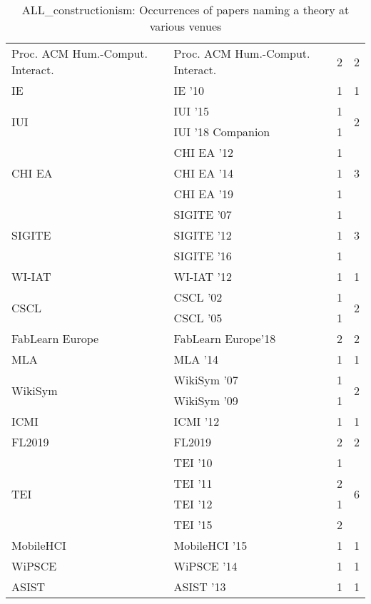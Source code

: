 \begin{table*}[t]
\begin{tabular}{llrr}
\multirow{1}{*}{Proc. ACM Hum.-Comput. Interact.} & Proc. ACM Hum.-Comput. Interact. & 2 & \multirow{1}{*}{2}\\
\multirow{1}{*}{IE } & IE '10 & 1 & \multirow{1}{*}{1}\\
\multirow{2}{*}{IUI } & IUI '15 & 1 & \multirow{2}{*}{2}\\
& IUI '18 Companion & 1 &\\
\multirow{3}{*}{CHI EA } & CHI EA '12 & 1 & \multirow{3}{*}{3}\\
& CHI EA '14 & 1 &\\
& CHI EA '19 & 1 &\\
\multirow{3}{*}{SIGITE } & SIGITE '07 & 1 & \multirow{3}{*}{3}\\
& SIGITE '12 & 1 &\\
& SIGITE '16 & 1 &\\
\multirow{1}{*}{WI-IAT } & WI-IAT '12 & 1 & \multirow{1}{*}{1}\\
\multirow{2}{*}{CSCL } & CSCL '02 & 1 & \multirow{2}{*}{2}\\
& CSCL '05 & 1 &\\
\multirow{1}{*}{FabLearn Europe} & FabLearn Europe'18 & 2 & \multirow{1}{*}{2}\\
\multirow{1}{*}{MLA } & MLA '14 & 1 & \multirow{1}{*}{1}\\
\multirow{2}{*}{WikiSym } & WikiSym '07 & 1 & \multirow{2}{*}{2}\\
& WikiSym '09 & 1 &\\
\multirow{1}{*}{ICMI } & ICMI '12 & 1 & \multirow{1}{*}{1}\\
\multirow{1}{*}{FL2019} & FL2019 & 2 & \multirow{1}{*}{2}\\
\multirow{4}{*}{TEI } & TEI '10 & 1 & \multirow{4}{*}{6}\\
& TEI '11 & 2 &\\
& TEI '12 & 1 &\\
& TEI '15 & 2 &\\
\multirow{1}{*}{MobileHCI } & MobileHCI '15 & 1 & \multirow{1}{*}{1}\\
\multirow{1}{*}{WiPSCE } & WiPSCE '14 & 1 & \multirow{1}{*}{1}\\
\multirow{1}{*}{ASIST } & ASIST '13 & 1 & \multirow{1}{*}{1}\\
\end{tabular}
\caption{ALL\_constructionism: Occurrences of papers naming a theory at various venues}
\end{table*}